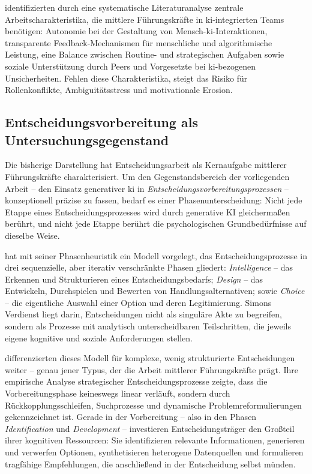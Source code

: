 \textcite{koponenWorkCharacteristicsNeeded2025} identifizierten durch eine systematische Literaturanalyse zentrale Arbeitscharakteristika, die mittlere Führungskräfte in \acrshort{ki}-integrierten Teams benötigen: Autonomie bei der Gestaltung von Mensch-\acrshort{ki}-Interaktionen, transparente Feedback-Mechanismen für menschliche und algorithmische Leistung, eine Balance zwischen Routine- und strategischen Aufgaben sowie soziale Unterstützung durch Peers und Vorgesetzte bei \acrshort{ki}-bezogenen Unsicherheiten. Fehlen diese Charakteristika, steigt das Risiko für Rollenkonflikte, Ambiguitätsstress und motivationale Erosion.

\subsection{Entscheidungsvorbereitung als Untersuchungsgegenstand}
\label{sec:entscheidungsvorbereitung}

Die bisherige Darstellung hat Entscheidungsarbeit als Kernaufgabe mittlerer Führungskräfte charakterisiert. Um den Gegenstandsbereich der vorliegenden Arbeit -- den Einsatz generativer \gls{ki} in \textit{Entscheidungsvorbereitungsprozessen} -- konzeptionell präzise zu fassen, bedarf es einer Phasenunterscheidung: Nicht jede Etappe eines Entscheidungsprozesses wird durch generative KI gleichermaßen berührt, und nicht jede Etappe berührt die psychologischen Grundbedürfnisse auf dieselbe Weise.

\textcite{simonNewScienceManagement1977} hat mit seiner Phasenheuristik ein Modell vorgelegt, das Entscheidungsprozesse in drei sequenzielle, aber iterativ verschränkte Phasen gliedert: \textit{Intelligence} -- das Erkennen und Strukturieren eines Entscheidungsbedarfs; \textit{Design} -- das Entwickeln, Durchspielen und Bewerten von Handlungsalternativen; sowie \textit{Choice} -- die eigentliche Auswahl einer Option und deren Legitimierung. Simons Verdienst liegt darin, Entscheidungen nicht als singuläre Akte zu begreifen, sondern als Prozesse mit analytisch unterscheidbaren Teilschritten, die jeweils eigene kognitive und soziale Anforderungen stellen.

\textcite{mintzbergStructureUnstructuredDecision1976} differenzierten dieses Modell für komplexe, wenig strukturierte Entscheidungen weiter -- genau jener Typus, der die Arbeit mittlerer Führungskräfte prägt. Ihre empirische Analyse strategischer Entscheidungsprozesse zeigte, dass die Vorbereitungsphase keineswegs linear verläuft, sondern durch Rückkopplungsschleifen, Suchprozesse und dynamische Problemreformulierungen gekennzeichnet ist. Gerade in der Vorbereitung -- also in den Phasen \textit{Identification} und \textit{Development} -- investieren Entscheidungsträger den Großteil ihrer kognitiven Ressourcen: Sie identifizieren relevante Informationen, generieren und verwerfen Optionen, synthetisieren heterogene Datenquellen und formulieren tragfähige Empfehlungen, die anschließend in der Entscheidung selbst münden.

